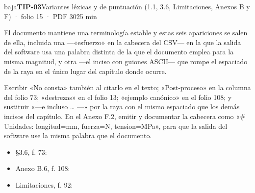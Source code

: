 \begin{ficha}{baja}{\casilla\textbf{TIP-03}\quad{}\quad Variantes léxicas y de puntuación (1.1, 3.6, Limitaciones, Anexos B y F) · folio 15 · PDF 30\hfill 25 min}
\par
{}El documento mantiene una terminología estable y estas seis apariciones se salen de ella, incluida una —«esfuerzo» en la cabecera del CSV— en la que la salida del software usa una palabra distinta de la que el documento emplea para la misma magnitud, y otra —el inciso con guiones ASCII— que rompe el espaciado de la raya en el único lugar del capítulo donde ocurre.\par
{}Escribir «No consta» también al citarlo en el texto; «Post-proceso» en la columna del folio 73; «destrezas» en el folio 13; «ejemplo canónico» en el folio 108; y sustituir «---e incluso … ---» por la raya con el mismo espaciado que los demás incisos del capítulo. En el Anexo F.2, emitir y documentar la cabecera como «\# Unidades: longitud=mm, fuerza=N, tension=MPa», para que la salida del software use la misma palabra que el documento.\par
{}\begin{itemize}[leftmargin=1.2em,itemsep=1pt,topsep=1pt]
\item {\small §3.6, f. 73: }
\item {\small Anexo B.6, f. 108: }
\item {\small Limitaciones, f. 92: }
\end{itemize}
\end{ficha}
